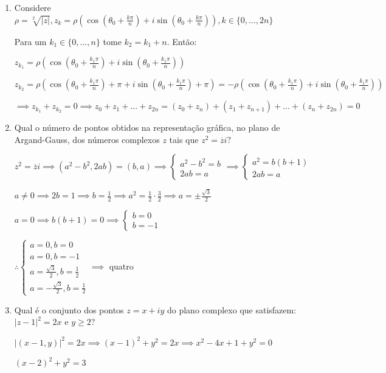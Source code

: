 \documentclass[12pt, openright, a4paper, twoside, english, brazil]{article}
\newenvironment{qitem}{
  \color{black}
\item}{\vspace{10pt}}
\newcommand{\cis}[1]{\displaystyle(\cos#1+i\sin#1)}
\begin{document}
\begin{enumerate}[\bfseries 1.]
\begin{qitem}
  \color{red}
  Considere $\rho=\sqrt[2]{|z|},
  z_k=\rho\cis{\left(\theta_0+\frac{k\pi}{n}\right)}, k\in\{0,...,2n\}$

  Para um $k_1\in\{0,...,n\}$ tome $k_2=k_1+n$. Então:

  $z_{k_1}=\rho\cis{\left(\theta_0+\frac{k_1\pi}{n}\right)}$

  $z_{k_2}=\rho\cis{\left(\theta_0+\frac{k_1\pi}{n}\right)+\pi}=-\rho\cis{\left(\theta_0+\frac{k_1\pi}{n}\right)}$

  $\implies z_{k_1}+z_{k_2}=0\implies
  z_0+z_1+...+z_{2n}=(z_0+z_n)+(z_1+z_{n+1})+...+(z_n+z_{2n})=0$
\end{qitem}

\begin{qitem} %
  Qual o número de pontos obtidos na representação gráfica, no plano
  de Argand-Gauss, dos números complexos $z$ tais que $z^2=\overline zi?$

  \color{red}
  $z^2=\overline zi\implies (a^2-b^2,2ab)=(b,a)\implies
  \begin{cases}a^2-b^2=b\\2ab=a
  \end{cases}\implies
  \begin{cases}a^2=b(b+1)\\2ab=a
  \end{cases}$

  $a\ne 0\implies 2b=1\implies b=\frac12\implies
  a^2=\frac12\cdot\frac32\implies a=\pm\frac{\sqrt3}{2}$

  $a=0\implies b(b+1)=0\implies
  \begin{cases}b=0\\b=-1
  \end{cases}$

  $\therefore
  \begin{cases}a=0, b=0\\ a=0, b=-1 \\ a=\frac{\sqrt3}{2}, b=\frac12
    \\ a=-\frac{\sqrt3}{2}, b=\frac12
  \end{cases}\implies$ quatro
\end{qitem}

\begin{qitem} %
  Qual é o conjunto dos pontos $z=x+iy$ do plano complexo que
  satisfazem: $|z-1|^2=2x$ e $y\ge 2$?

  \color{red}
  $|(x-1,y)|^2=2x\implies (x-1)^2+y^2=2x\implies x^2-4x+1+y^2=0$

  $(x-2)^2+y^2=3$


\end{qitem}
\end{enumerate}
\end{document}
